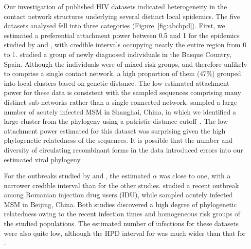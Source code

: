 \documentclass[nogrid]{MBE}
\begin{document}
Our investigation of published HIV datasets indicated heterogeneity in the
contact network structures underlying several distinct local epidemics. The
five datasets analysed fell into three categories (Figure~\ref{fig:abchpd}).
First, we estimated a preferential attachment power between 0.5 and 1 for the
epidemics studied by \citet{cuevas2009hiv} and \citet{li2015hiv}, with credible
intervals occupying nearly the entire region from 0 to 1.
\citeauthor{cuevas2009hiv} studied a group of newly diagnosed individuals in
the Basque Country, Spain. Although the individuals were of mixed risk groups,
and therefore unlikely to comprise a single contact network, a high proportion
of them (47\%) grouped into local clusters based on genetic distance. The low
estimated attachment power for these data is consistent with the sampled
sequences comprising many distinct sub-networks rather than a single connected
network. \citeauthor{li2015hiv} sampled a large number of acutely infected
MSM in Shanghai, China, in which we identified a large cluster from the
phylogeny using a patristic distance cutoff~\citep{poon2015impact}. The low
attachment power estimated for this dataset was surprising given the high
phylogenetic relatedness of the sequences. It is possible that the number and
diversity of circulating recombinant forms in the data introduced errors into
our estimated viral phylogeny.

For the outbreaks studied by \citet{niculescu2015recent} and
\citet{wang2015targeting}, the estimated $\alpha$ was close to one, with a
narrower credible interval than for the other studies.
\citeauthor{niculescu2015recent} studied a recent outbreak among Romanian
injection drug users (IDU), while \citeauthor{wang2015targeting} sampled
acutely infected MSM in Beijing, China. Both studies discovered a high degree
of phylogenetic relatedness owing to the recent infection times and homogeneous
risk groups of the studied populations. The estimated number of infections for
these datasets were also quite low, although the HPD interval for
\citeauthor{wang2015targeting} was much wider than that for
\citeauthor{niculescu2015recent}.
\end{document}
